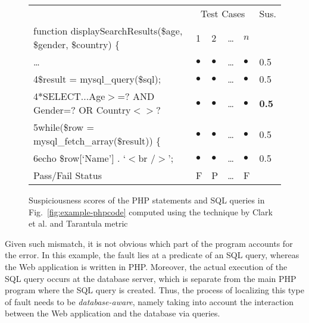 
\begin{figure}[t]
    \centering
    \scriptsize
    \setlength{\tabcolsep}{2pt}
    \renewcommand{\arraystretch}{1.1}
{\sffamily
\begin{tabular}{@{}llllll@{}}
    \toprule
                                                                                    & \multicolumn{4}{c}{Test Cases} & Sus.\\
                                                                                    \cmidrule{2-5}
    function displaySearchResults(\$age, \$gender, \$country) \{                    & 1         & 2         & \ldots         & $n$ \\
    \ldots                                                                          & $\bullet$ & $\bullet$ & \ldots    & $\bullet$ & 0.5\\
    4\hspace{5pt}\$result = mysql\_query(\$sql);                                   & $\bullet$ & $\bullet$ & \ldots    & $\bullet$ & 0.5\\
    4$\ast$\hspace{10pt}SELECT...Age$>$=? AND Gender=? OR Country$<>$?                  & $\bullet$ & $\bullet$ & \ldots    & $\bullet$ & \textbf{0.5}\\
    5\hspace{5pt}while(\$row = mysql\_fetch\_array(\$result)) \{                    & $\bullet$ & $\bullet$ & \ldots    & $\bullet$ & 0.5\\
    6\hspace{20pt}echo \$row[`Name'] . `$<$br /$>$';                                    & $\bullet$ & $\bullet$ & \ldots    & $\bullet$ & 0.5\\
    \midrule
    Pass/Fail Status                                                                & F       & P     & \ldots    & F \\
    \bottomrule
\end{tabular}
}
    \caption{Suspiciousness scores of the PHP statements and SQL queries in Fig.~\ref{fig:example-phpcode} computed using the technique by Clark et al. and Tarantula metric}\label{fig:suspiciousness}
\end{figure}

Given such mismatch, it is not obvious which part of the program
accounts for the error. In this example, the fault lies at a predicate
of an SQL query, whereas the Web application is written in
PHP. Moreover, the actual execution of the SQL query occurs at the
database server, which is separate from the main PHP program where the
SQL query is created. Thus, the process of localizing this type of
fault needs to be \emph{database-aware}, namely taking into account
the interaction between the Web application and the database via
queries.

